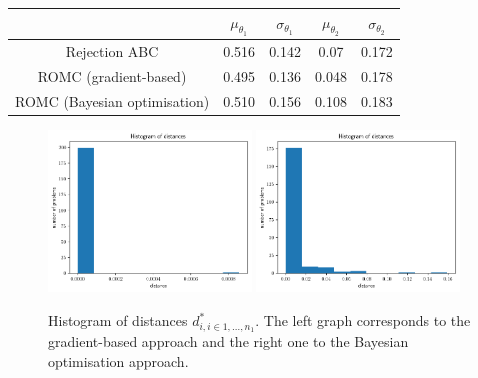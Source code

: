\begin{center} \label{tab:ma2}
\begin{tabular}{ c|c|c|c|c }
\hline
& $\mu_{\theta_1}$ & $\sigma_{\theta_1}$ & $\mu_{\theta_2}$ & $\sigma_{\theta_2}$ \\
\hline \hline
Rejection ABC & 0.516 & 0.142 & 0.07 & 0.172 \\
\hline
ROMC (gradient-based) & 0.495 & 0.136 & 0.048 & 0.178 \\
\hline
ROMC (Bayesian optimisation) & 0.510 & 0.156 & 0.108 & 0.183 \\
\hline
\end{tabular}
\end{center}

\begin{figure}[h]
    \begin{center}
      \includegraphics[width=0.48\textwidth]{./Thesis/images/chapter4/ma2_distance_hist.png}
      \includegraphics[width=0.48\textwidth]{./Thesis/images/chapter4/ma2_distance_hist_bo.png}
    \end{center}
  \caption{Histogram of distances $d_{i, i \in {1, \ldots, n_1}}^*$. The left graph corresponds to the gradient-based approach and the right one to the Bayesian optimisation approach.}
  \label{fig:ma2_2}
\end{figure}


